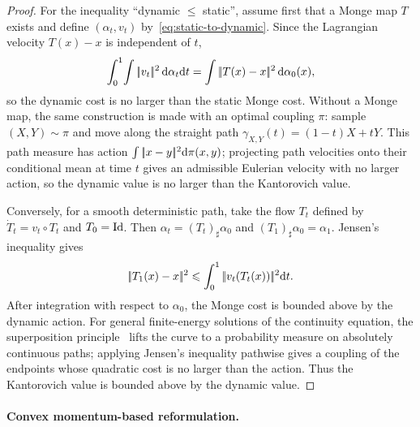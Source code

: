 \begin{proof}
	For the inequality ``dynamic $\leq$ static'', assume first that a Monge map $T$ exists and define $(\alpha_t,v_t)$ by~\eqref{eq:static-to-dynamic}. Since the Lagrangian velocity $T(x)-x$ is independent of $t$,
	\[
		\int_0^1\!\int|\!| v_t |\!|^2\,\mathrm{d}\alpha_t\mathrm{d} t
		=
		\int|\!| T(x)-x |\!|^2\,\mathrm{d}\alpha_0(x),
	\]
	so the dynamic cost is no larger than the static Monge cost. Without a Monge map, the same construction is made with an optimal coupling $\pi$: sample $(X,Y)\sim\pi$ and move along the straight path $\gamma_{X,Y}(t)=(1-t)X+tY$. This path measure has action $\int|\!| x-y |\!|^2\mathrm{d}\pi(x,y)$; projecting path velocities onto their conditional mean at time $t$ gives an admissible Eulerian velocity with no larger action, so the dynamic value is no larger than the Kantorovich value.

	Conversely, for a smooth deterministic path, take the flow $T_t$ defined by $\dot T_t=v_t\circ T_t$ and $T_0=\mathrm{Id}$. Then $\alpha_t=(T_t)_\sharp\alpha_0$ and $(T_1)_\sharp\alpha_0=\alpha_1$. Jensen's inequality gives
	\[
		|\!| T_1(x)-x |\!|^2
		\leqslant
		\int_0^1|\!| v_t(T_t(x)) |\!|^2\mathrm{d} t.
	\]
	After integration with respect to $\alpha_0$, the Monge cost is bounded above by the dynamic action. For general finite-energy solutions of the continuity equation, the superposition principle~\citep{ambrosio2006gradient} lifts the curve to a probability measure on absolutely continuous paths; applying Jensen's inequality pathwise gives a coupling of the endpoints whose quadratic cost is no larger than the action. Thus the Kantorovich value is bounded above by the dynamic value.
\end{proof}

\paragraph{Convex momentum-based reformulation.}

